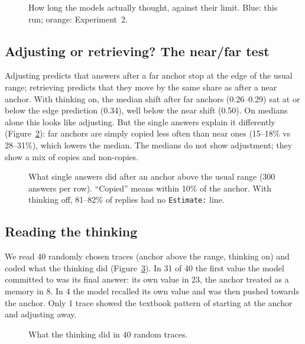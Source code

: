 \documentclass[11pt,a4paper]{article}
\begin{document}
\begin{figure}[ht]
\centering{}
\caption{How long the models actually thought, against their limit. Blue: this run; orange: Experiment~2.}
\label{fig:tokens}
\end{figure}

\subsection{Adjusting or retrieving? The near/far test}

Adjusting predicts that answers after a far anchor stop at the edge of the usual range; retrieving predicts that they move by the same share as after a near anchor. With thinking on, the median shift after far anchors (0.26--0.29) sat at or below the edge prediction (0.34), well below the near shift (0.50). On medians alone this looks like adjusting. But the single answers explain it differently (Figure~\ref{fig:outcomes}): far anchors are simply copied less often than near ones (15--18\% vs 28--31\%), which lowers the median. The medians do not show adjustment; they show a mix of copies and non-copies.

\begin{figure}[ht]
\centering{}
\caption{What single answers did after an anchor above the usual range (300 answers per row). \enquote{Copied} means within 10\% of the anchor. With thinking off, 81--82\% of replies had no \texttt{Estimate:} line.}
\label{fig:outcomes}
\end{figure}

\subsection{Reading the thinking}

We read 40 randomly chosen traces (anchor above the range, thinking on) and coded what the thinking did (Figure~\ref{fig:traces}). In 31 of 40 the first value the model committed to was its final answer: its own value in 23, the anchor treated as a memory in 8. In 4 the model recalled its own value and was then pushed towards the anchor. Only 1 trace showed the textbook pattern of starting at the anchor and adjusting away.

\begin{figure}[ht]
\centering{}
\caption{What the thinking did in 40 random traces.}
\label{fig:traces}
\end{figure}
\end{document}
